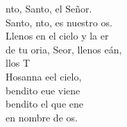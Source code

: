 \begin{cancion}[Santo][Estepa]%
	nto, Santo, el Señor.\\
	Santo, nto, es nuestro os.\\
	Llenos en el cielo y la er\\
	de tu oria, Seor, llenos eán,\\
	llos T\\
	Hosanna eel cielo, \\
	bendito eue viene\\
	bendito el que ene \\
	en nombre de os.\\
\end{cancion}%

